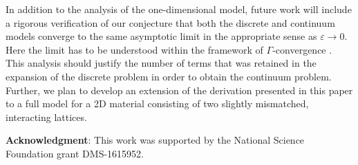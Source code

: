 \documentclass{siamltex}
\begin{document}
{In addition to the analysis of the one-dimensional model, future work will include a rigorous verification of our conjecture that both the discrete and continuum models converge to the same asymptotic limit in the appropriate sense as $\varepsilon\to0$. Here the limit has to be understood within the framework of $\Gamma$-convergence \cite{braides2002gamma}. This analysis should justify the number of terms that was retained in the expansion of the discrete problem in order to obtain the continuum problem. Further, we plan to develop an extension of the derivation presented in this paper to a full model for a 2D material consisting of two slightly mismatched, interacting lattices.} 



\bigskip
\textbf{Acknowledgment}:
This work was supported by the National Science Foundation grant DMS-1615952.


	
\end{document}
